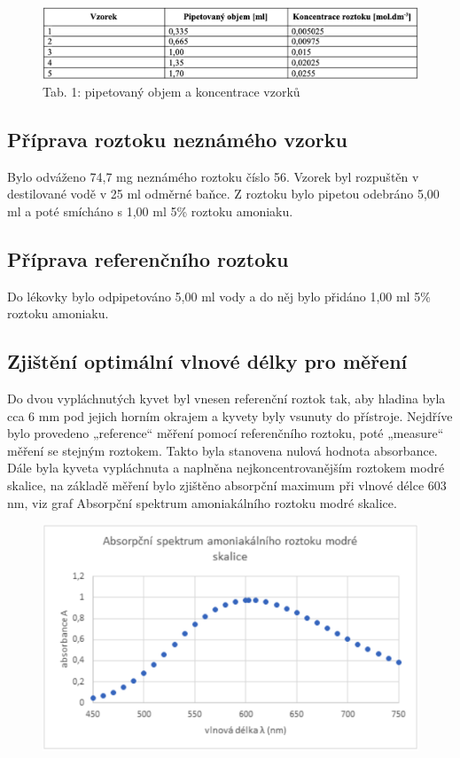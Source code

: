 \documentclass[13pt, a4paper, twoside]{article}
\begin{document}
    \begin{figure}[H]
        \centering
        \includegraphics[width=6.5in]{uloha_5_tab_1.png}
        \caption*{Tab. 1: pipetovaný objem a koncentrace vzorků}
    \end{figure}

    \subsection*{Příprava roztoku neznámého vzorku}
    Bylo odváženo 74,7 mg neznámého roztoku číslo 56. Vzorek byl rozpuštěn v destilované vodě v 25 ml odměrné baňce. Z roztoku bylo pipetou odebráno 5,00 ml a poté smícháno s 1,00 ml 5\% roztoku amoniaku.

    \subsection*{Příprava referenčního roztoku}
    Do lékovky bylo odpipetováno 5,00 ml vody a do něj bylo přidáno 1,00 ml 5\% roztoku amoniaku.

    \subsection*{Zjištění optimální vlnové délky pro měření}
    Do dvou vypláchnutých kyvet byl vnesen referenční roztok tak, aby hladina byla cca 6 mm pod jejich horním okrajem a kyvety byly vsunuty do přístroje. Nejdříve bylo provedeno „reference“ měření pomocí referenčního roztoku, poté „measure“ měření se stejným roztokem. Takto byla stanovena nulová hodnota absorbance. Dále byla kyveta vypláchnuta a naplněna nejkoncentrovanějším roztokem modré skalice, na základě měření bylo zjištěno absorpční maximum při vlnové délce 603 nm, viz graf Absorpční spektrum amoniakálního roztoku modré skalice.

    \begin{figure}[H]
        \centering
        \includegraphics[width=6.5in]{uloha_5_graf_1.png}
    \end{figure}
\end{document}
